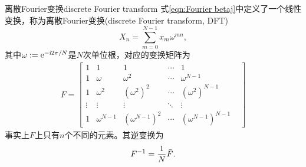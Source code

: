 \begin{definition}
    {离散Fourier变换}{discrete Fourier transform}
    式\eqref{eqn:Fourier betaj}中定义了一个线性变换，称为离散Fourier变换(discrete Fourier transform, DFT)
    \[
        X_n=\sum_{m=0}^{N-1}x_m\omega^{mn},
    \]
    其中$\omega:=\mathop{}\!\mathrm{e}^{-\mathrm{i}2\pi/N}$是$N$次单位根，对应的变换矩阵为
    \begin{eqnarray}
        F=\begin{bmatrix}
            1&1&1&\cdots&1\\
            1&\omega&\omega^2&\cdots&\omega^{N-1}\\
            1&\omega^2&(\omega^2)^2&\cdots&(\omega^2)^{N-1}\\
            \vdots&\vdots&\vdots&\ddots&\vdots&\\
            1&\omega^{N-1}&(\omega^{N-1})^2&\cdots&(\omega^{N-1})^{N-1}
        \end{bmatrix}
    \end{eqnarray}
    事实上$F$上只有$n$个不同的元素。其逆变换为
    \begin{equation}
        F^{-1}=\frac1N\bar F.
    \end{equation}
\end{definition}

